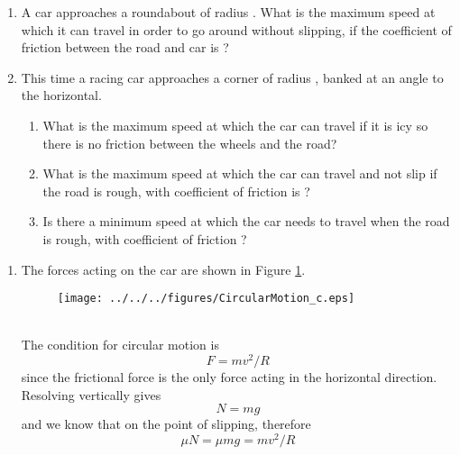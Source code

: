 

\begin{problem}
{
\begin{enumerate}
\item A car approaches a roundabout of radius . What is the maximum speed at which it can travel in order to go around without slipping, if the coefficient of friction between the road and car is \vari{\mu}?
\item This time a racing car approaches a corner of radius , banked at an angle \vari{\theta} to the horizontal. 
\begin{enumerate}
\item What is the maximum speed at which the car can travel if it is icy so there is no friction between the wheels and the road?
\item What is the maximum speed at which the car can travel and not slip if the road is rough, with coefficient of friction is \vari{\mu}?
\item Is there a minimum speed at which the car needs to travel when the road is rough, with coefficient of friction \vari{\mu}?\end{enumerate} \end{enumerate}}
{}
{\begin{enumerate}
\item The forces acting on the car are shown in Figure \ref{fig:CircularMotion_c}.
\begin{figure}[h]
\centering
\texttt{[image: ../../../figures/CircularMotion\_c.eps]}
\caption{}
\label{fig:CircularMotion_c}
\end{figure}
\\
The condition for circular motion is
\begin{equation*}
F=mv^2/R
\end{equation*}
since the frictional force  is the only force acting in the horizontal direction. Resolving vertically gives
\begin{equation*}
N=mg
\end{equation*}
and we know that \value{F}{\mu N}{} on the point of slipping, therefore
\begin{equation*}
\mu N=\mu mg=mv^2/R
\end{equation*}

\end{enumerate}}
\end{problem}
